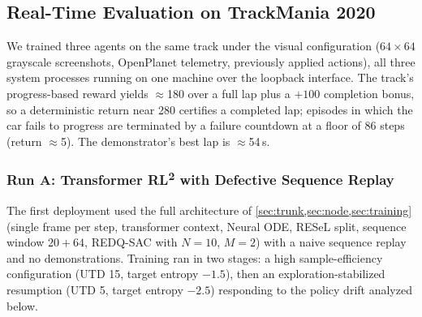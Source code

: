\documentclass[conference]{IEEEtran}
\newcommand{\rltwo}{RL\textsuperscript{2}}
\begin{document}
\subsection{Real-Time Evaluation on TrackMania 2020}

\label{sec:tm_exp}

We trained three agents on the same track under the visual configuration ($64{\times}64$ grayscale screenshots, OpenPlanet telemetry, previously applied actions), all three system processes running on one machine over the loopback interface. The track's progress-based reward yields $\approx$180 over a full lap plus a $+100$ completion bonus, so a deterministic return near 280 certifies a completed lap; episodes in which the car fails to progress are terminated by a failure countdown at a floor of 86 steps (return $\approx$5). The demonstrator's best lap is $\approx$54\,s.



\subsubsection{Run A: Transformer \rltwo{} with Defective Sequence Replay}

\label{sec:runa}

The first deployment used the full architecture of \cref{sec:trunk,sec:node,sec:training} (single frame per step, transformer context, Neural ODE, RESeL split, sequence window $20+64$, REDQ-SAC with $N{=}10$, $M{=}2$) with a naive sequence replay and no demonstrations. Training ran in two stages: a high sample-efficiency configuration (UTD 15, target entropy $-1.5$), then an exploration-stabilized resumption (UTD 5, target entropy $-2.5$) responding to the policy drift analyzed below.
\end{document}
